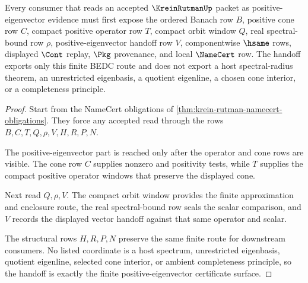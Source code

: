 \begin{theorem}
\label{thm:krein-rutman-positive-eigenvector-handoff}
Every consumer that reads an accepted $\KreinRutmanUp$ packet as positive-eigenvector evidence must first expose the ordered Banach row $B$, positive cone row $C$, compact positive operator row $T$, compact orbit window $Q$, real spectral-bound row $\rho$, positive-eigenvector handoff row $V$, componentwise $\hsame$ rows, displayed $\Cont$ replay, $\Pkg$ provenance, and local $\NameCert$ row. The handoff exports only this finite BEDC route and does not export a host spectral-radius theorem, an unrestricted eigenbasis, a quotient eigenline, a chosen cone interior, or a completeness principle.
\end{theorem}
\begin{proof}
Start from the NameCert obligations of \autoref{thm:krein-rutman-namecert-obligations}. They force any accepted read through the rows $B,C,T,Q,\rho,V,H,R,P,N$.

The positive-eigenvector part is reached only after the operator and cone rows are visible. The cone row $C$ supplies nonzero and positivity tests, while $T$ supplies the compact positive operator windows that preserve the displayed cone.

Next read $Q,\rho,V$. The compact orbit window provides the finite approximation and enclosure route, the real spectral-bound row seals the scalar comparison, and $V$ records the displayed vector handoff against that same operator and scalar.

The structural rows $H,R,P,N$ preserve the same finite route for downstream consumers. No listed coordinate is a host spectrum, unrestricted eigenbasis, quotient eigenline, selected cone interior, or ambient completeness principle, so the handoff is exactly the finite positive-eigenvector certificate surface.
\end{proof}


\begin{closurestatus}{\KreinRutmanUp}
  \theoryclosure{\seedClosure}
  \formalstatus{\unformalizedV}
\end{closurestatus}

